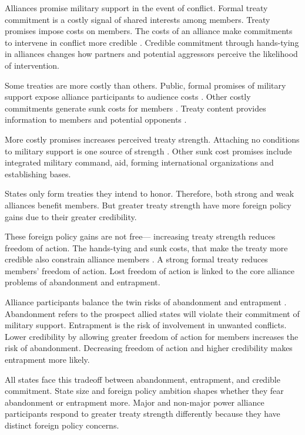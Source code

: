 \documentclass[12pt]{article}
\begin{document}
Alliances promise military support in the event of conflict. 
Formal treaty commitment is a costly signal of shared interests among members.
Treaty promises impose costs on members. 
The costs of an alliance make commitments to intervene in conflict more credible \citep{Fearon1997, Morrow2000}. 
Credible commitment through hands-tying in alliances changes how partners and potential aggressors perceive the likelihood of intervention. 


Some treaties are more costly than others. 
Public, formal promises of military support expose alliance participants to audience costs \citep{Morrow2000}.
Other costly commitments generate sunk costs for members \citep{Morrow2000}.
Treaty content provides information to members and potential opponents \citep{Leeds2003}.


More costly promises increases perceived treaty strength. 
Attaching no conditions to military support is one source of strength \citep{Benson2012}.
Other sunk cost promises include integrated military command, aid, forming international organizations and establishing bases. 


States only form treaties they intend to honor.
Therefore, both strong and weak alliances benefit members.  
But greater treaty strength have more foreign policy gains due to their greater credibility. 


These foreign policy gains are not free--- increasing treaty strength reduces freedom of action. 
The hands-tying and sunk costs, that make the treaty more credible also constrain alliance members \citep{Schelling1985}.
A strong formal treaty reduces members' freedom of action.  
Lost freedom of action is linked to the core alliance problems of abandonment and entrapment. 


Alliance participants balance the twin risks of abandonment and entrapment \citep{Snyder1997, Benson2012}.
Abandonment refers to the prospect allied states will violate their commitment of military support. 
Entrapment is the risk of involvement in unwanted conflicts. 
Lower credibility by allowing greater freedom of action for members increases the risk of abandonment. 
Decreasing freedom of action and higher credibility makes entrapment more likely.  


All states face this tradeoff between abandonment, entrapment, and credible commitment. 
State size and foreign policy ambition shapes whether they fear abandonment or entrapment more. 
Major and non-major power alliance participants respond to greater treaty strength differently because they have distinct foreign policy concerns. 
\end{document}
